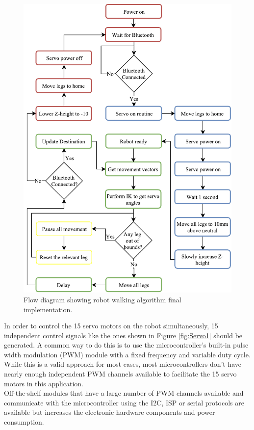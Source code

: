 \begin{figure}[H]
\centering
\includegraphics[scale = 1]{pics/Soft2.pdf}
\caption{Flow diagram showing robot walking algorithm final implementation.}
\label{fig:Soft2}
\end{figure}

In order to control the 15 servo motors on the robot simultaneously, 15 independent control signals like the ones shown in Figure \ref{fig:Servo1} should be generated. A common way to do this is to use the microcontroller's built-in pulse width modulation (PWM) module with a fixed frequency and variable duty cycle. While this is a valid approach for most cases, most microcontrollers don't have nearly enough independent PWM channels available to facilitate the 15 servo motors in this application.\\

Off-the-shelf modules that have a large number of PWM channels available and communicate with the microcontroller using the I2C, ISP or serial protocols are available but increases the electronic hardware components and power consumption.\\

